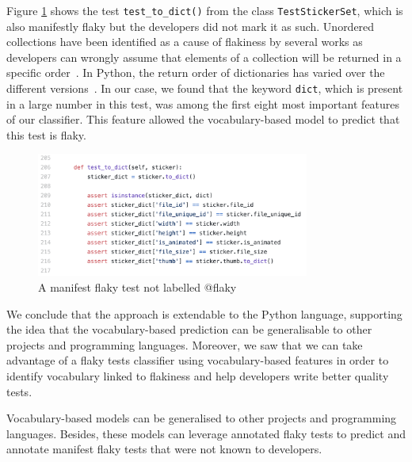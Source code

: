 Figure \ref{manifest-flaky-example2} shows the test \texttt{test\_to\_dict()} from the class \texttt{TestStickerSet}, which is also manifestly flaky but the developers did not mark it as such. 
Unordered collections have been identified as a cause of flakiness by several works as developers can wrongly assume that elements of a collection will be returned in a specific order~\cite{Luo2014,Dutta2020}.
In Python, the return order of dictionaries has varied over the different versions~\cite{PythonDoc, unorderedCollectionsStackOverflow}. In our case, we found that the keyword \texttt{dict}, which is present in a large number in this test, was among the first eight most important features of our classifier.
This feature allowed the vocabulary-based model to predict that this test is flaky.

\begin{figure}[h]
\centering
\includegraphics[width=0.8\textwidth]{figures/replication/manifestFlakyExample2.png}
\caption{A manifest flaky test not labelled @flaky}
\label{manifest-flaky-example2}
\end{figure}

We conclude that the approach is extendable to the Python language, supporting the idea that the vocabulary-based prediction can be generalisable to other projects and programming languages. Moreover, we saw that we can take advantage of a flaky tests classifier using vocabulary-based features in order to identify vocabulary linked to flakiness and help developers write better quality tests.\\

\begin{tcolorbox}
Vocabulary-based models can be generalised to other projects and programming languages. 
Besides, these models can leverage annotated flaky tests to predict and annotate manifest flaky tests that were not known to developers.
\end{tcolorbox}

